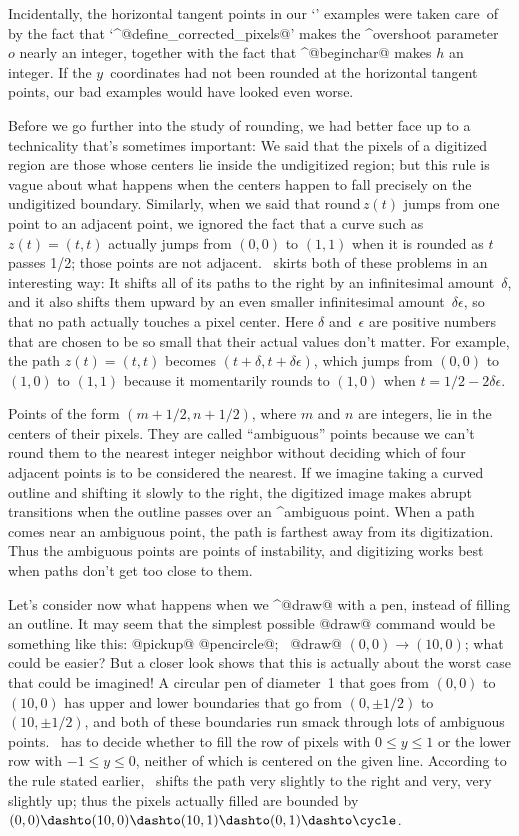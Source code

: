 \ddanger Incidentally, the horizontal tangent points in our `{\manual\IOO}'
examples were taken care~of by the fact that `^@define\_corrected\_pixels@'
makes the ^{overshoot} parameter~$o$ nearly an integer, together with
the fact that ^@beginchar@ makes $h$ an integer. If the $y$~coordinates
had not been rounded at the horizontal tangent points,
our bad examples would have looked even worse.

\danger Before we go further into the study of rounding, we had better
face up to a technicality that's sometimes important: We said that the
pixels of a digitized region are those whose centers lie inside the
undigitized region; but this rule is vague about what happens when the
centers happen to fall precisely on the undigitized boundary. Similarly,
when we said that round$\,z(t)$ jumps from one point to an adjacent point,
we ignored the fact that a curve such as $z(t)=(t,t)$ actually
jumps from $(0,0)$ to $(1,1)$ when it is rounded as $t$ passes 1/2;
those points are not adjacent.
\MF\ skirts both of these problems in an interesting way:
It shifts all of its paths to the
right by an infinitesimal amount~$\delta$, and it also shifts them
upward by an even smaller
infinitesimal amount~$\delta\epsilon$, so that no path actually
touches a pixel center. Here $\delta$ and~$\epsilon$ are positive numbers
that are chosen to be so small that their actual values don't matter.
For example, the path $z(t)=(t,t)$ becomes $(t+\delta,t+\delta\epsilon)$,
which jumps from $(0,0)$ to $(1,0)$ to $(1,1)$ because it momentarily
rounds to $(1,0)$ when $t=1/2-2\delta\epsilon$.

\danger Points of the form $(m+1/2,n+1/2)$, where $m$ and $n$ are integers,
lie in the centers of their pixels. They are called ``ambiguous'' points
because we can't round them to the nearest integer neighbor without
deciding which of four adjacent points is to be considered the nearest.
If we imagine taking a curved outline and shifting it slowly to the
right, the digitized image makes abrupt transitions when the outline
passes over an ^{ambiguous point}. When a path comes near an ambiguous
point, the path is farthest away from its digitization. Thus the
ambiguous points are points of instability, and digitizing works best
when paths don't get too close to them.

\danger Let's consider now what happens when we ^@draw@ with a pen,
instead of filling an outline. It may seem that the simplest possible @draw@
command would be something like this:
\begindisplay
@pickup@ @pencircle@; \ @draw@ $(0,0)\to(10,0)$;
\enddisplay
what could be easier? But a closer look shows that this is actually
about the worst case that could be imagined! A circular pen of
diameter~1 that goes from $(0,0)$ to $(10,0)$ has upper and lower
boundaries that go from $(0,\pm1/2)$ to $(10,\pm1/2)$,
and both of these boundaries run smack through lots of
ambiguous points. \MF\ has to decide whether to fill the row of pixels
with $0\le y\le1$ or the lower row with $-1\le y\le0$, neither of which is
centered on the given line. According to the rule stated earlier, \MF\
shifts the path very slightly to the right and very, very slightly up;
thus the pixels actually filled are bounded by
$(0,0)\dashto(10,0)\dashto(10,1)\dashto(0,1)\dashto\cycle$.

